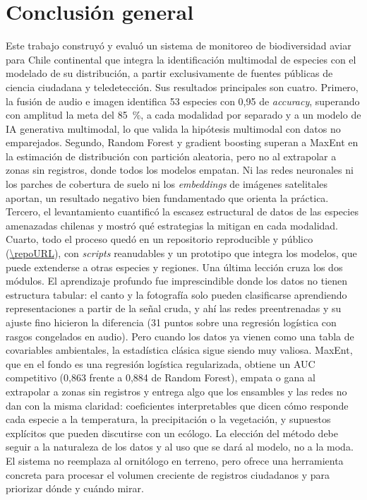 \section{Conclusión general}\label{sec:conclusion}

Este trabajo construyó y evaluó un sistema de monitoreo de biodiversidad
aviar para Chile continental que integra la identificación multimodal de
especies con el modelado de su distribución, a partir exclusivamente de
fuentes públicas de ciencia ciudadana y teledetección. Sus resultados
principales son cuatro. Primero, la fusión de audio e imagen identifica 53
especies con 0,95 de \textit{accuracy}, superando con amplitud la meta del
\SI{85}{\percent}, a cada modalidad por separado y a un modelo de IA generativa multimodal, lo que valida la hipótesis multimodal con datos no
emparejados. Segundo, Random Forest y gradient boosting superan a MaxEnt en
la estimación de distribución con partición aleatoria, pero no al extrapolar a
zonas sin registros, donde todos los modelos empatan. Ni las redes
neuronales ni los parches de cobertura de suelo ni los \textit{embeddings}
de imágenes satelitales aportan, un resultado negativo bien fundamentado que
orienta la práctica. Tercero, el
levantamiento cuantificó la escasez estructural de datos de las especies
amenazadas chilenas y mostró qué estrategias la mitigan en cada modalidad.
Cuarto, todo el proceso quedó en un repositorio reproducible y público
(\url{\repoURL}), con \textit{scripts} reanudables y un prototipo que integra los modelos, que
puede extenderse a otras especies y regiones. Una última lección cruza los dos módulos. El aprendizaje profundo fue
imprescindible donde los datos no tienen estructura tabular: el canto y la
fotografía solo pueden clasificarse aprendiendo representaciones a partir de
la señal cruda, y ahí las redes preentrenadas y su ajuste fino hicieron la
diferencia (31 puntos sobre una regresión logística con rasgos congelados en
audio). Pero cuando los datos ya vienen como una tabla de covariables
ambientales, la estadística clásica sigue siendo muy valiosa. MaxEnt, que en
el fondo es una regresión logística regularizada, obtiene un AUC competitivo
(0,863 frente a 0,884 de Random Forest), empata o gana al extrapolar a zonas
sin registros y entrega algo que los ensambles y las redes no dan con la
misma claridad: coeficientes interpretables que dicen cómo responde cada
especie a la temperatura, la precipitación o la vegetación, y supuestos
explícitos que pueden discutirse con un ecólogo. La elección del método debe
seguir a la naturaleza de los datos y al uso que se dará al modelo, no a la
moda. El sistema no reemplaza al ornitólogo en terreno, pero ofrece una
herramienta concreta para procesar el volumen creciente de registros
ciudadanos y para priorizar dónde y cuándo mirar.
